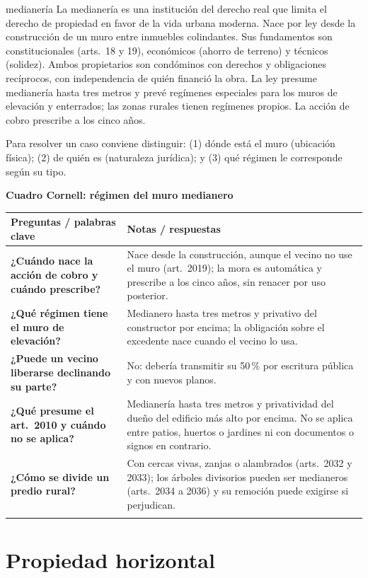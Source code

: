 \documentclass[12pt,oneside]{book}
\renewcommand{\arraystretch}{1.25}
\newcommand{\cq}[2]{\textbf{#1} & #2 \\[0.45em]}
\newcommand{\cornell}[3]{%
\par\bigskip\noindent\textbf{\large Cuadro Cornell: #1}\par\smallskip
\begin{center}
\small
\renewcommand{\arraystretch}{1.15}
\begin{tabularx}{\textwidth}{>{\raggedright\arraybackslash}p{0.27\textwidth}>{\raggedright\arraybackslash}X}
\toprule
\textbf{Preguntas / palabras clave} & \textbf{Notas / respuestas} \\
\midrule
#2
\midrule
\multicolumn{2}{p{\dimexpr\textwidth-2\tabcolsep\relax}}{\textbf{Resumen.} #3} \\
\bottomrule
\end{tabularx}
\end{center}
}
\begin{document}
\begin{conceptoclave}{medianería}
La medianería es una institución del derecho real que limita el derecho de propiedad en favor de la vida urbana moderna. Nace por ley desde la construcción de un muro entre inmuebles colindantes. Sus fundamentos son constitucionales (arts.~18 y 19), económicos (ahorro de terreno) y técnicos (solidez). Ambos propietarios son condóminos con derechos y obligaciones recíprocos, con independencia de quién financió la obra. La ley presume medianería hasta tres metros y prevé regímenes especiales para los muros de elevación y enterrados; las zonas rurales tienen regímenes propios. La acción de cobro prescribe a los cinco años.
\end{conceptoclave}

Para resolver un caso conviene distinguir: (1) dónde está el muro (ubicación física); (2) de quién es (naturaleza jurídica); y (3) qué régimen le corresponde según su tipo.

\cornell{régimen del muro medianero}{
\cq{¿Cuándo nace la acción de cobro y cuándo prescribe?}{Nace desde la construcción, aunque el vecino no use el muro (art.~2019); la mora es automática y prescribe a los cinco años, sin renacer por uso posterior.}
\cq{¿Qué régimen tiene el muro de elevación?}{Medianero hasta tres metros y privativo del constructor por encima; la obligación sobre el excedente nace cuando el vecino lo usa.}
\cq{¿Puede un vecino liberarse declinando su parte?}{No: debería transmitir su 50\,\% por escritura pública y con nuevos planos.}
\cq{¿Qué presume el art.~2010 y cuándo no se aplica?}{Medianería hasta tres metros y privatividad del dueño del edificio más alto por encima. No se aplica entre patios, huertos o jardines ni con documentos o signos en contrario.}
\cq{¿Cómo se divide un predio rural?}{Con cercas vivas, zanjas o alambrados (arts.~2032 y 2033); los árboles divisorios pueden ser medianeros (arts.~2034 a 2036) y su remoción puede exigirse si perjudican.}
}{El cobro de la medianería nace con la construcción, con mora automática y prescripción a los cinco años. La ley presume medianería hasta tres metros, con regímenes diferenciados para elevación y muros enterrados. No es posible liberarse de las obligaciones sin transmitir la parte, y la medianería rural se ordena con cercas vivas, zanjas y alambrados.}

\part{Propiedad horizontal}
\end{document}
